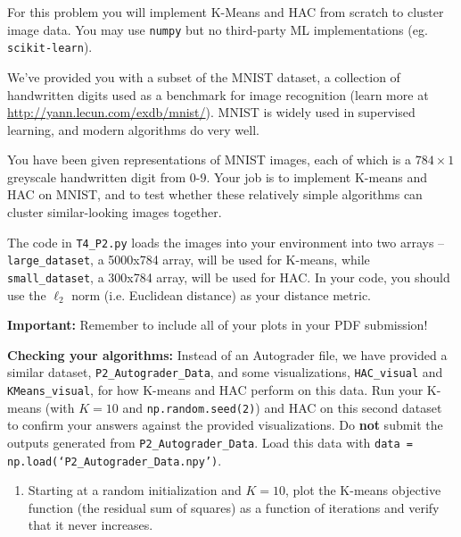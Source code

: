 \documentclass[submit]{harvardml}
\begin{document}
\newpage


\begin{problem}


For this problem you will implement K-Means and HAC from scratch to cluster image data. You may use \texttt{numpy} but no third-party ML implementations (eg. \texttt{scikit-learn}).

We've provided you with a subset of the MNIST dataset, a collection of
handwritten digits used as a benchmark for image recognition (learn more at
\url{http://yann.lecun.com/exdb/mnist/}). MNIST is widely used in supervised learning, and modern algorithms do very well. 

You have been given
representations of MNIST images, each of which is a $784\times1$
greyscale handwritten digit from 0-9. Your job is to implement K-means and HAC on MNIST, and to test whether these relatively
simple algorithms can cluster similar-looking images together.

The code in \texttt{T4\_P2.py} loads the images into your environment into two arrays -- \texttt{large\_dataset}, a 5000x784 array, will be used for K-means, while \texttt{small\_dataset}, a 300x784 array, will be used for HAC. In your code, you should use the $\ell_2$ norm (i.e. Euclidean distance) as your distance metric.

\textbf{Important:} Remember to include all of your plots in your PDF submission!

\textbf{Checking your algorithms:} Instead of an Autograder file, we have provided a similar dataset, \texttt{P2\_Autograder\_Data}, and some visualizations, \texttt{HAC\_visual} and \texttt{KMeans\_visual}, for how K-means and HAC perform on this data. Run your K-means (with $K=10$ and \texttt{np.random.seed(2)}) and HAC on this second dataset to confirm your answers against the provided visualizations. Do \textbf{not} submit the outputs generated from \texttt{P2\_Autograder\_Data}. Load this data with \texttt{data = np.load(`P2\_Autograder\_Data.npy')}.

\begin{enumerate}

\item Starting at a random initialization and $K = 10$, plot
  the K-means objective function (the residual sum of squares) as a function of iterations and verify
  that it never increases.


\end{enumerate}
\end{problem}
\end{document}
